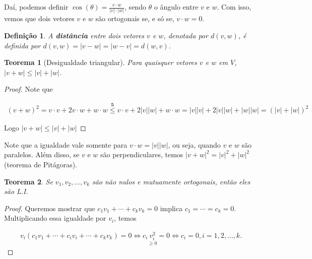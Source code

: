 \documentclass{article}
\newtheorem{theorem}{Teorema}[section]
\newtheorem*{definition}{Definição}
\begin{document}
\par\vspace{0.3cm} Daí, podemos definir $\displaystyle{ \cos(\theta) = \frac{v\cdot w}{|v|\cdot|w|}}$, sendo $\theta$ o ângulo entre $v$ e $w$. Com isso, vemos que dois vetores $v$ e $w$ são ortogonais se, e só se, $v\cdot w = 0$.

\begin{definition}
	A \textbf{distância} entre dois vetores $v$ e $w$, denotada por $d(v,w)$, é definida por $d(v,w) = |v - w| = |w - v| = d(w,v)$. 
\end{definition}

\begin{theorem}[Desigualdade triangular]
	Para quaisquer vetores $v$ e $w$ em $V$, $|v+w|\leq |v| + |w|$.
\end{theorem}

\begin{proof}
	Note que 
	
	\begin{align*}
	(v+w)^2 = v\cdot v + 2v\cdot w + w\cdot w \overset{\textbf{5}}{\leq} v\cdot v + 2|v||w| + w\cdot w = |v||v| + 2|v||w| + |w||w| = (|v| + |w|)^2
	\end{align*}
	
	\par\vspace{0.3cm} Logo $|v+w|\leq |v| + |w|$
	
\end{proof}

\par\vspace{0.3cm} Note que a igualdade vale somente para $v\cdot w = |v||w|$, ou seja, quando $v$ e $w$ são paralelos. Além disso, se $v$ e $w$ são perpendiculares, temos $|v+w|^2 = |v|^2 + |w|^2$ (teorema de Pitágoras).

\begin{theorem}
	Se $v_1, v_2, \dots, v_k$ são não nulos e mutuamente ortogonais, então eles são L.I.
\end{theorem}

\begin{proof}
	Queremos mostrar que $c_1v_1 + \cdots + c_kv_k = 0$ implica $c_1 = \cdots = c_k = 0$. Multiplicando essa igualdade por $v_i$, temos
	
	\begin{align*}
	v_i(c_1v_1 + \cdots + c_iv_i + \cdots +  c_kv_k) = 0 \Leftrightarrow c_i\underset{\geq 0}{v_i^2} = 0 \Leftrightarrow c_i = 0, i=1, 2, \dots, k.
	\end{align*}
	
\end{proof}
\end{document}
